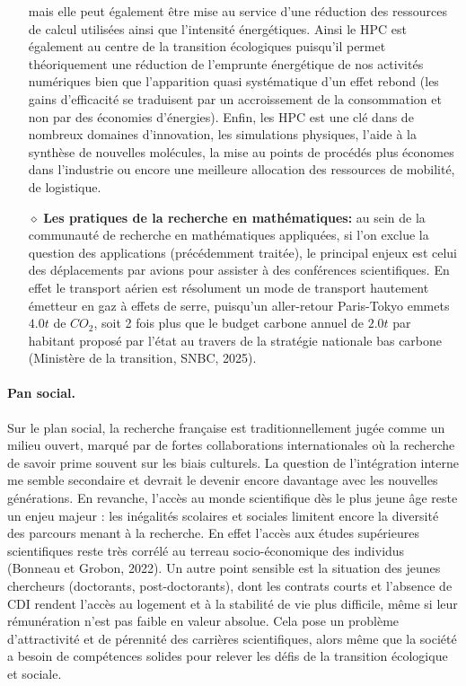 \documentclass[11pt,a4paper]{article}
\begin{document}
\begin{itemize}
      mais elle peut également être mise au service d'une réduction des ressources de calcul utilisées ainsi que l'intensité énergétiques. Ainsi 
      le HPC est également au centre de la transition écologiques puisqu'il permet théoriquement une réduction de l'emprunte énergétique de nos activités numériques bien que
      l'apparition quasi systématique d'un effet rebond (les gains d'efficacité se traduisent par un accroissement de la consommation et non par des économies d'énergies).
      Enfin, les HPC est une clé dans de nombreux domaines d'innovation, les simulations physiques, l'aide à la synthèse de nouvelles molécules,
      la mise au points de procédés plus économes dans l'industrie ou encore une meilleure allocation des ressources de mobilité, de logistique.
      \item[$\diamond$]\textbf{Les pratiques de la recherche en mathématiques:} au sein de la communauté de recherche en mathématiques appliquées,
      si l'on exclue la question des applications (précédemment traitée), le principal enjeux est celui des déplacements par avions pour assister à des conférences scientifiques.
      En effet le transport aérien est résolument un mode de transport hautement émetteur en gaz à effets de serre, puisqu'un aller-retour Paris-Tokyo emmets $4.0t$ de $CO_2$, 
      soit 2 fois plus que le budget carbone annuel de $2.0t$ par habitant proposé par l'état au travers de la stratégie nationale bas carbone (Ministère de la transition, SNBC, 2025).
      \end{itemize}
    \paragraph{Pan social.}
      Sur le plan social, la recherche française est traditionnellement jugée comme un milieu ouvert, marqué par de fortes collaborations 
      internationales où la recherche de savoir prime souvent sur les biais culturels. La question de l'intégration interne 
      me semble secondaire et devrait le devenir encore davantage avec les nouvelles générations. 
      En revanche, l'accès au monde scientifique dès le plus jeune âge reste un enjeu majeur : les inégalités scolaires et sociales 
      limitent encore la diversité des parcours menant à la recherche. En effet l'accès aux études supérieures scientifiques reste très 
      corrélé au terreau socio-économique des individus (Bonneau et Grobon, 2022).
      Un autre point sensible est la situation des jeunes chercheurs (doctorants, post-doctorants), dont les contrats courts 
      et l'absence de CDI rendent l’accès au logement et à la stabilité de vie plus difficile, même si leur rémunération n’est pas 
      faible en valeur absolue. Cela pose un problème d’attractivité et de pérennité des carrières scientifiques, alors même que 
      la société a besoin de compétences solides pour relever les défis de la transition écologique et sociale.
\end{document}
